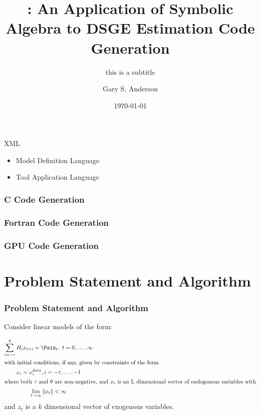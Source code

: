 \documentclass{beamer}
\begin{document}
\title[Symbolic Algebra Code Generation]{\dsgecg: An Application of Symbolic Algebra to DSGE Estimation Code Generation}
\subtitle{this is a subtitle}


\author{Gary S. Anderson}
\date{\today} 


\frame{\titlepage}




\begin{frame}{XML }

  \begin{itemize}
  \item Model Definition Language
  \item Tool Application Language
  \end{itemize}

  
\end{frame}

\begin{frame}
  \frametitle{C Code Generation}
  
\end{frame}

\begin{frame}
  \frametitle{Fortran Code Generation}
  
\end{frame}

\begin{frame}
  \frametitle{GPU Code Generation}
  
\end{frame}



  \section{Problem Statement and Algorithm}


\begin{frame}
  \frametitle{Problem Statement and Algorithm}
  
  

Consider linear models of the form:


\begin{gather}
\sum_{i=-\tau}^\theta{H_i x_{t+i}}= \Psi%
z_{t}, \,\, t = 0,\ldots,\infty\label{eq:canonical}\\ \intertext{with initial conditions, if any, given by constraints of the form}%
x_i  =  x^{data}_i,  i =  - \tau, \ldots, -1\label{eq:init}\\ \intertext{where both $\tau$ and $\theta$ are non-negative, and $x_t$ is an L dimensional vector 
of endogenous variables with}%
\lim_{ t \rightarrow\infty} \|x_t\|   < \infty\label{eq:limit} %
\end{gather}
{ and $z_t$ is a $k$ dimensional vector of exogenous variables.}

\end{frame}
\end{document}

